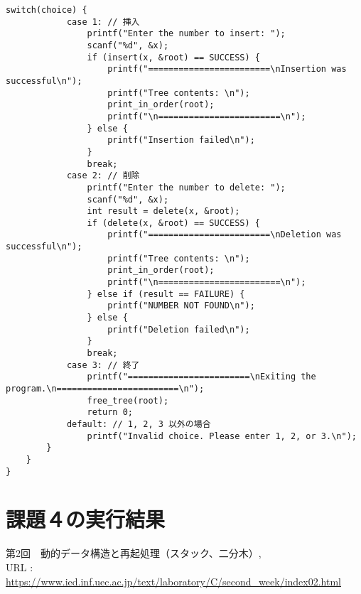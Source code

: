 \documentclass[]{jsarticle}
\begin{document}
\begin{lstlisting}[caption={binarySearchTree.c}]
        switch(choice) {
            case 1: // 挿入
                printf("Enter the number to insert: ");
                scanf("%d", &x);
                if (insert(x, &root) == SUCCESS) {
                    printf("========================\nInsertion was successful\n");
                    printf("Tree contents: \n");
                    print_in_order(root);
                    printf("\n========================\n");
                } else {
                    printf("Insertion failed\n");
                }
                break;
            case 2: // 削除
                printf("Enter the number to delete: ");
                scanf("%d", &x);
                int result = delete(x, &root);
                if (delete(x, &root) == SUCCESS) {
                    printf("========================\nDeletion was successful\n");
                    printf("Tree contents: \n");
                    print_in_order(root);
                    printf("\n========================\n");
                } else if (result == FAILURE) {
                    printf("NUMBER NOT FOUND\n");
                } else {
                    printf("Deletion failed\n");
                }
                break;
            case 3: // 終了
                printf("========================\nExiting the program.\n========================\n");
                free_tree(root);
                return 0;
            default: // 1, 2, 3 以外の場合
                printf("Invalid choice. Please enter 1, 2, or 3.\n");
        }
    }
}
\end{lstlisting}

\section*{課題４の実行結果}

\newpage
\begin{thebibliography}{99}
   第2回　動的データ構造と再起処理（スタック、二分木）, \\URL : \url{https://www.ied.inf.uec.ac.jp/text/laboratory/C/second_week/index02.html}
\end{thebibliography}
\end{document}
